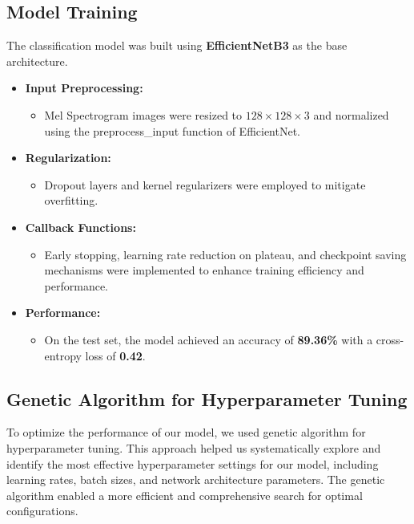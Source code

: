 \subsection{Model Training}  
The classification model was built using \textbf{EfficientNetB3} as the base architecture.  

\begin{itemize}
    \item \textbf{Input Preprocessing:}  
    \begin{itemize}
        \item Mel Spectrogram images were resized to \(128 \times 128 \times 3\) and normalized using the preprocess\_input function of EfficientNet.  
    \end{itemize}

    \item \textbf{Regularization:}  
    \begin{itemize}
        \item Dropout layers and kernel regularizers were employed to mitigate overfitting.  
    \end{itemize}

    \item \textbf{Callback Functions:}  
    \begin{itemize}
        \item Early stopping, learning rate reduction on plateau, and checkpoint saving mechanisms were implemented to enhance training efficiency and performance.  
    \end{itemize}

    \item \textbf{Performance:}  
    \begin{itemize}
        \item On the test set, the model achieved an accuracy of \textbf{89.36\%} with a cross-entropy loss of \textbf{0.42}.  
    \end{itemize}
\end{itemize}

\subsection{Genetic Algorithm for Hyperparameter Tuning}
To optimize the performance of our model, we used genetic algorithm for hyperparameter tuning. 
This approach helped us systematically explore and identify the most effective hyperparameter settings for our model, 
including learning rates, batch sizes, and network architecture parameters. 
The genetic algorithm enabled a more efficient and comprehensive search for optimal configurations.

